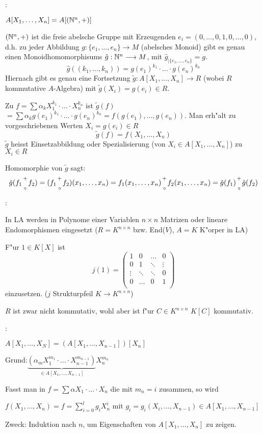 :{
$A[X_1,\ldots,X_n]=A[(\mathbb N^n,+)]$

$(\mathbb N^n,+)$ ist die freie abelsche Gruppe mit Erzeugenden $e_i =(0,\ldots,0,1,0,\ldots,0)$,
d.h. zu jeder Abbildung $g:\{e_1,\ldots,e_n\}\longrightarrow M$ (abelsches Monoid)
gibt es genau einen Monoidhomomorphisums $\hat g:\mathbb N^n \longrightarrow M$, mit
$\hat g_{|\{e_1,\ldots,e_n\}}=g$. 
\[\hat g((k_1,\ldots,k_n))=g(e_1)^{k_1}\cdot \ldots \cdot g(e_n)^{k_n}\]
Hiernach gibt es genau eine Fortsetzung $\tilde{g}: A[X_1,\ldots,X_n] \longrightarrow R$ (wobei
$R$ kommutative $A$-Algebra) mit $\tilde{g}(X_i)=g(e_i)\in R$.

Zu $f=\sum \alpha_k X_1^{k_1}\cdot \ldots \cdot X_n^{k_n}$ ist $\tilde{g}(f)$
$=\sum \alpha_k g(e_1)^{k_1}\cdot \ldots \cdot g(e_n)^{k_n}=f(g(e_1), \ldots, g(e_n))$.
Man erh"alt zu vorgeschriebenen Werten $X_i=g(e_i)\in R$ 
\[\tilde{g}(f)=f(X_1,\ldots,X_n)\]
$\tilde{g}$ heisst Einsetzabbildung oder Spezialisierung (von $X_i\in A[X_1,\ldots,X_n]$)
zu $X_i\in R$

Homomorphie von $\tilde{g}$ sagt: 
\[\tilde{g}(f_1 \stack(+;\circ)f_2)=(f_1\stack(+;\circ)f_2)(x_1,\ldots,x_n)=f_1(x_1,\ldots,x_n)
\stack(+;\circ)f_2(x_1,\ldots,x_n)=\tilde g(f_1)\stack(+;\circ)\tilde g(f_2) \] 
}
\remark{}:{In LA werden in Polynome einer Variablen $n\times n$ Matrizen oder lineare
 Endomorphismen eingesetzt ($R=K^{n\times n}$ bzw. End($V$), $A=K$ K"orper in LA)

 F"ur $1\in K[X]$ ist \begin{displaymath} j(1)=\left(
 \begin{array}{cccc}
 1 & 0 & \ldots & 0\\
 0 & 1 & \ddots & \vdots \\
 \vdots & \ddots & \ddots & 0 \\
 0 & \ldots & 0 & 1 \\ 
 \end{array} \right)
 \end{displaymath} einzusetzen.
 ($j$ Strukturpfeil $K\longrightarrow K^{n\times n}$)
 
 $R$ ist zwar nicht kommutativ, wohl aber ist f"ur $C\in K^{n\times n}$  
 $K[C]$ kommutativ.}
\remark{}:{$A[X_1,\ldots,X_N]=(A[X_1,\ldots,X_{n-1}])[X_n]$

 Grund:$\underbrace{(\alpha_m X_1^{m_1}\cdot \ldots \cdot X_{n-1}^{m_{n-1}})}_{\in A[X_1,\ldots,X_{n-1}]}
 X_n^{m_n}$

 Fasst man in $f=\sum \alpha X_1 \cdot \ldots \cdot X_n$ die mit $m_n=i$ zusammen, so wird

 $f(X_1,\ldots,X_n)=f=\sum_{i=0}^{l} g_i X_n^i$ mit $g_i =g_i(X_i, \ldots, X_{n-1})
 \in A[X_1,\ldots,X_{n-1}]$

 Zweck: Induktion nach $n$, um Eigenschaften von $A[X_1,\ldots, X_n]$ zu zeigen.}
